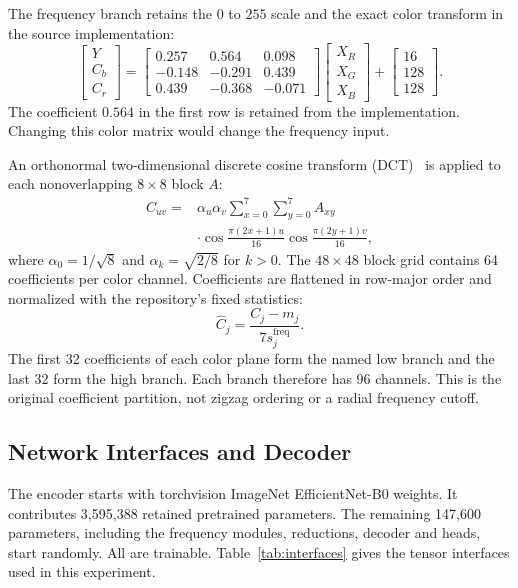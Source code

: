 \documentclass[conference,letterpaper]{IEEEtran}
\begin{document}
The frequency branch retains the $0$ to $255$ scale and the exact color transform in the source implementation:
\begin{equation}
\begin{bmatrix}Y\\C_b\\C_r\end{bmatrix}
=
\begin{bmatrix}
0.257&0.564&0.098\\
-0.148&-0.291&0.439\\
0.439&-0.368&-0.071
\end{bmatrix}
\begin{bmatrix}X_R\\X_G\\X_B\end{bmatrix}
+
\begin{bmatrix}16\\128\\128\end{bmatrix}.
\label{eq:color}
\end{equation}
The coefficient $0.564$ in the first row is retained from the implementation. Changing this color matrix would change the frequency input.

An orthonormal two-dimensional discrete cosine transform (DCT)~\cite{dct} is applied to each nonoverlapping $8\times8$ block $A$:
\begin{equation}
\begin{aligned}
C_{uv}={}&\alpha_u\alpha_v
\sum_{x=0}^{7}\sum_{y=0}^{7} A_{xy}\\
&\cdot\cos\frac{\pi(2x+1)u}{16}
\cos\frac{\pi(2y+1)v}{16},
\end{aligned}
\label{eq:dct}
\end{equation}
where $\alpha_0=1/\sqrt{8}$ and $\alpha_k=\sqrt{2/8}$ for $k>0$. The $48\times48$ block grid contains 64 coefficients per color channel. Coefficients are flattened in row-major order and normalized with the repository's fixed statistics:
\begin{equation}
 \widehat C_j=\frac{C_j-m_j}{7s_j^{\mathrm{freq}}}.
 \label{eq:freqnorm}
\end{equation}
The first 32 coefficients of each color plane form the named low branch and the last 32 form the high branch. Each branch therefore has 96 channels. This is the original coefficient partition, not zigzag ordering or a radial frequency cutoff.

\subsection{Network Interfaces and Decoder}
The encoder starts with torchvision ImageNet EfficientNet-B0 weights. It contributes 3,595,388 retained pretrained parameters. The remaining 147,600 parameters, including the frequency modules, reductions, decoder and heads, start randomly. All are trainable. Table~\ref{tab:interfaces} gives the tensor interfaces used in this experiment.
\end{document}
